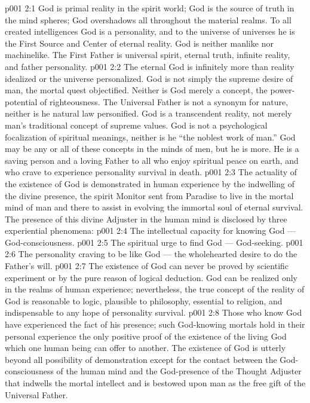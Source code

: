 \vs p001 2:1 God is primal reality in the spirit world; God is the source of truth in the mind spheres; God overshadows all throughout the material realms. To all created intelligences God is a personality, and to the universe of universes he is the First Source and Center of eternal reality. God is neither manlike nor machinelike. The First Father is universal spirit, eternal truth, infinite reality, and father personality.
\vs p001 2:2 \pc The eternal God is infinitely more than reality idealized or the universe personalized. God is not simply the supreme desire of man, the mortal quest objectified. Neither is God merely a concept, the power\hyp{}potential of righteousness. The Universal Father is not a synonym for nature, neither is he natural law personified. God is a transcendent reality, not merely man’s traditional concept of supreme values. God is not a psychological focalization of spiritual meanings, neither is he “the noblest work of man.” God may be any or all of these concepts in the minds of men, but he is more. He is a saving person and a loving Father to all who enjoy spiritual peace on earth, and who crave to experience personality survival in death.
\vs p001 2:3 \pc The actuality of the existence of God is demonstrated in human experience by the indwelling of the divine presence, the spirit Monitor sent from Paradise to live in the mortal mind of man and there to assist in evolving the immortal soul of eternal survival. The presence of this divine Adjuster in the human mind is disclosed by three experiential phenomena:
\vs p001 2:4 \bibnobreakspace The intellectual capacity for knowing God --- God\hyp{}consciousness.
\vs p001 2:5 \bibnobreakspace The spiritual urge to find God --- God\hyp{}seeking.
\vs p001 2:6 \bibnobreakspace The personality craving to be like God --- the wholehearted desire to do the Father’s will.
\vs p001 2:7 \pc The existence of God can never be proved by scientific experiment or by the pure reason of logical deduction. God can be realized only in the realms of human experience; nevertheless, the true concept of the reality of God is reasonable to logic, plausible to philosophy, essential to religion, and indispensable to any hope of personality survival.
\vs p001 2:8 Those who know God have experienced the fact of his presence; such God\hyp{}knowing mortals hold in their personal experience the only positive proof of the existence of the living God which one human being can offer to another. The existence of God is utterly beyond all possibility of demonstration except for the contact between the God\hyp{}consciousness of the human mind and the God\hyp{}presence of the Thought Adjuster that indwells the mortal intellect and is bestowed upon man as the free gift of the Universal Father.
